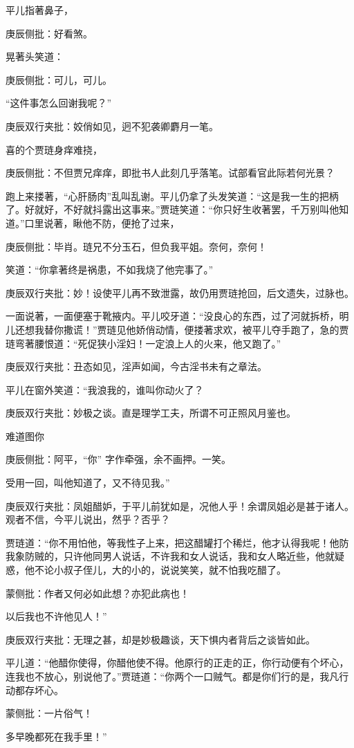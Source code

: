 \begin{parag}


    平儿指著鼻子，\begin{note}庚辰侧批：好看煞。\end{note}晃著头笑道：\begin{note}庚辰侧批：可儿，可儿。\end{note}“这件事怎么回谢我呢？”\begin{note}庚辰双行夹批：姣俏如见，迥不犯袭卿麝月一笔。\end{note}喜的个贾琏身痒难挠，\begin{note}庚辰侧批：不但贾兄痒痒，即批书人此刻几乎落笔。试部看官此际若何光景？\end{note}跑上来搂著，“心肝肠肉”乱叫乱谢。平儿仍拿了头发笑道：“这是我一生的把柄了。好就好，不好就抖露出这事来。”贾琏笑道：“你只好生收著罢，千万别叫他知道。”口里说著，瞅他不防，便抢了过来，\begin{note}庚辰侧批：毕肖。琏兄不分玉石，但负我平姐。奈何，奈何！\end{note}笑道：“你拿著终是祸患，不如我烧了他完事了。”\begin{note}庚辰双行夹批：妙！设使平儿再不致泄露，故仍用贾琏抢回，后文遗失，过脉也。\end{note}一面说著，一面便塞于靴掖内。平儿咬牙道：“没良心的东西，过了河就拆桥，明儿还想我替你撒谎！”贾琏见他娇俏动情，便搂著求欢，被平儿夺手跑了，急的贾琏弯著腰恨道：“死促狭小淫妇！一定浪上人的火来，他又跑了。”\begin{note}庚辰双行夹批：丑态如见，淫声如闻，今古淫书未有之章法。\end{note}平儿在窗外笑道：“我浪我的，谁叫你动火了？\begin{note}庚辰双行夹批：妙极之谈。直是理学工夫，所谓不可正照风月鉴也。\end{note}难道图你\begin{note}庚辰侧批：阿平，“你” 字作牵强，余不画押。一笑。\end{note}受用一回，叫他知道了，又不待见我。”\begin{note}庚辰双行夹批：凤姐醋妒，于平儿前犹如是，况他人乎！余谓凤姐必是甚于诸人。观者不信，今平儿说出，然乎？否乎？\end{note}贾琏道：“你不用怕他，等我性子上来，把这醋罐打个稀烂，他才认得我呢！他防我象防贼的，只许他同男人说话，不许我和女人说话，我和女人略近些，他就疑惑，他不论小叔子侄儿，大的小的，说说笑笑，就不怕我吃醋了。\begin{note}蒙侧批：作者又何必如此想？亦犯此病也！\end{note}以后我也不许他见人！”\begin{note}庚辰双行夹批：无理之甚，却是妙极趣谈，天下惧内者背后之谈皆如此。\end{note}平儿道：“他醋你使得，你醋他使不得。他原行的正走的正，你行动便有个坏心，连我也不放心，别说他了。”贾琏道：“你两个一口贼气。都是你们行的是，我凡行动都存坏心。\begin{note}蒙侧批：一片俗气！\end{note}多早晚都死在我手里！”
\end{parag}


